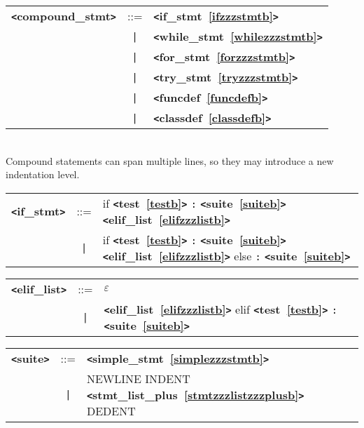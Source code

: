 \documentclass[12pt]{article}
\begin{document}
\label{compoundzzzstmtb}
\newlength{\tw}
\settowidth{\tw}{compound\_stmt  ::=  }
\addtolength{\tw}{2\arraycolsep}
\newlength{\len}
\setlength{\len}{\textwidth}
\addtolength{\len}{-1\tw}
\begin{tabular}{lcp{\len}}
{\bf \verb+<+compound\_stmt\verb+>+} & ::=  & {\bf \verb+<+if\_stmt~\ref{ifzzzstmtb}\verb+>+}  \\
 & \verb+|+  & {\bf \verb+<+while\_stmt~\ref{whilezzzstmtb}\verb+>+}  \\
 & \verb+|+  & {\bf \verb+<+for\_stmt~\ref{forzzzstmtb}\verb+>+}  \\
 & \verb+|+  & {\bf \verb+<+try\_stmt~\ref{tryzzzstmtb}\verb+>+}  \\
 & \verb+|+  & {\bf \verb+<+funcdef~\ref{funcdefb}\verb+>+}  \\
 & \verb+|+  & {\bf \verb+<+classdef~\ref{classdefb}\verb+>+}  \\
\end{tabular} \\

Compound statements can span multiple lines, so they may introduce a new indentation level.

\label{ifzzzstmtb}
\newlength{\tw}
\settowidth{\tw}{if\_stmt  ::=  }
\addtolength{\tw}{2\arraycolsep}
\newlength{\len}
\setlength{\len}{\textwidth}
\addtolength{\len}{-1\tw}
\begin{tabular}{lcp{\len}}
{\bf \verb+<+if\_stmt\verb+>+} & ::=  & if {\bf \verb+<+test~\ref{testb}\verb+>+}  \verb|:| {\bf \verb+<+suite~\ref{suiteb}\verb+>+}  {\bf \verb+<+elif\_list~\ref{elifzzzlistb}\verb+>+}  \\
 & \verb+|+  & if {\bf \verb+<+test~\ref{testb}\verb+>+}  \verb|:| {\bf \verb+<+suite~\ref{suiteb}\verb+>+}  {\bf \verb+<+elif\_list~\ref{elifzzzlistb}\verb+>+}  else \verb|:| {\bf \verb+<+suite~\ref{suiteb}\verb+>+}  \\
\end{tabular}

\label{elifzzzlistb}
\begin{tabular}{lcl}
{\bf \verb+<+elif\_list\verb+>+} & ::=  & $\varepsilon$ \\
 & \verb+|+  & {\bf \verb+<+elif\_list~\ref{elifzzzlistb}\verb+>+}  elif {\bf \verb+<+test~\ref{testb}\verb+>+}  \verb|:| {\bf \verb+<+suite~\ref{suiteb}\verb+>+}  \\
\end{tabular}

\label{suiteb}
\begin{tabular}{lcl}
{\bf \verb+<+suite\verb+>+} & ::=  & {\bf \verb+<+simple\_stmt~\ref{simplezzzstmtb}\verb+>+}  \\
 & \verb+|+  & NEWLINE INDENT {\bf \verb+<+stmt\_list\_plus~\ref{stmtzzzlistzzzplusb}\verb+>+}  DEDENT \\
\end{tabular} \\
\end{document}
